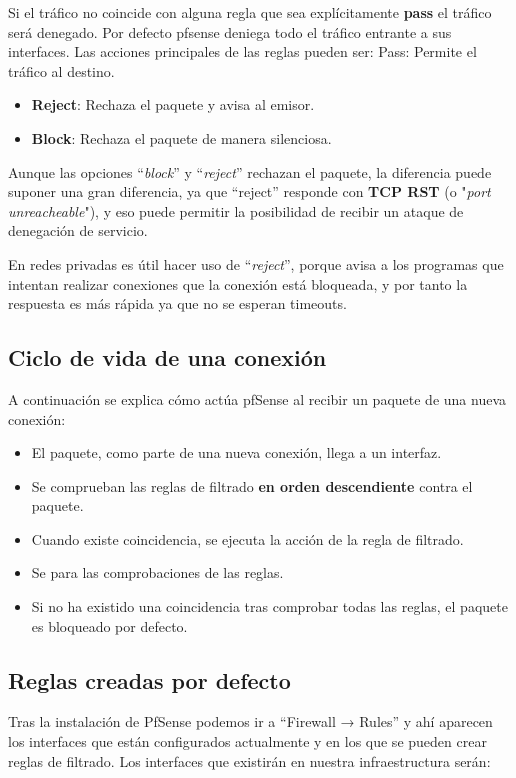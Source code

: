 Si el tráfico no coincide con alguna regla que sea explícitamente \textbf{pass} el tráfico será denegado. Por defecto pfsense deniega todo el tráfico entrante a sus interfaces. Las acciones principales de las reglas pueden ser:
Pass: Permite el tráfico al destino.

\begin{itemize}
    \item \textbf{Reject}: Rechaza el paquete y avisa al emisor.
    \item \textbf{Block}: Rechaza el paquete de manera silenciosa.
\end{itemize}

Aunque las opciones “\textit{block}” y “\textit{reject}” rechazan el paquete, la diferencia puede suponer una gran diferencia, ya que “reject” responde con \textbf{TCP RST }(o "\textit{port unreacheable}"), y eso puede permitir la posibilidad de recibir un ataque de denegación de servicio.


En redes privadas es útil hacer uso de “\textit{reject}”, porque avisa a los programas que intentan realizar conexiones que la conexión está bloqueada, y por tanto la respuesta es más rápida ya que no se esperan timeouts.

\hypertarget{ciclo_vida_conexiones}{}
\subsection{Ciclo de vida de una conexión}
A continuación se explica cómo actúa pfSense al recibir un paquete de una nueva conexión:

\begin{itemize}
    \item El paquete, como parte de una nueva conexión, llega a un interfaz.
    \item Se comprueban las reglas de filtrado \textbf{en orden descendiente} contra el paquete.
    \item Cuando existe coincidencia, se ejecuta la acción de la regla de filtrado.
    \item Se para las comprobaciones de las reglas.
    \item Si no ha existido una coincidencia tras comprobar todas las reglas, el paquete es bloqueado por defecto.
\end{itemize}


\subsection{Reglas creadas por defecto}
Tras la instalación de PfSense podemos ir a “Firewall → Rules” y ahí aparecen los interfaces que están configurados actualmente y en los que se pueden crear reglas de filtrado. Los interfaces que existirán en nuestra infraestructura serán:


